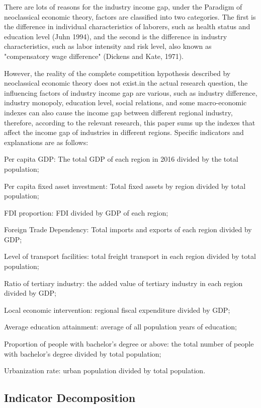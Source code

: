 \documentclass[12pt, titlepage]{article}
\begin{document}
There are lots of reasons for the industry income gap, under the Paradigm of neoclassical economic theory, factors are classified into two categories. The first is the difference in individual characteristics of laborers, such as health status and education level (Juhn 1994), and the second is the difference in industry characteristics, such as labor intensity and risk level, also known as "compensatory wage difference" (Dickens and Kate, 1971).

However, the reality of the complete competition hypothesis described by neoclassical economic theory does not exist.in the actual research question, the influencing factors of industry income gap are various, such as industry difference, industry monopoly, education level, social relations, and some macro-economic indexes can also cause the income gap between different regional industry, therefore, according to the relevant research, this paper sums up the indexes that affect the income gap of industries in different regions. Specific indicators and explanations are as follows:

Per capita GDP: The total GDP of each region in 2016 divided by the total population;

Per capita fixed asset investment: Total fixed assets by region divided by total population;

FDI proportion: FDI divided by GDP of each region;

Foreign Trade Dependency: Total imports and exports of each region divided by GDP;

Level of transport facilities: total freight transport in each region divided by total population;

Ratio of tertiary industry: the added value of tertiary industry in each region divided by GDP;

Local economic intervention: regional fiscal expenditure divided by GDP;

Average education attainment: average of all population years of education;

Proportion of people with bachelor's degree or above: the total number of people with bachelor's degree divided by total population;

Urbanization rate: urban population divided by total population.


\subsection{Indicator Decomposition}
\end{document}
